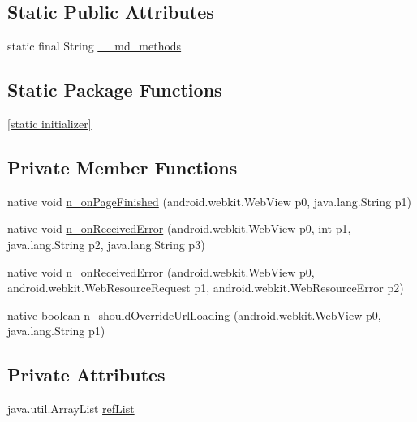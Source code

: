 \subsection*{Static Public Attributes}
\begin{CompactItemize}
\item 
static final String \hyperlink{classmd5b60ffeb829f638581ab2bb9b1a7f4f3f_1_1_web_view_renderer___web_client_b15ec026f7472a54d028a56570e44543}{\_\-\_\-md\_\-methods}
\end{CompactItemize}
\subsection*{Static Package Functions}
\begin{CompactItemize}
\item 
\hyperlink{classmd5b60ffeb829f638581ab2bb9b1a7f4f3f_1_1_web_view_renderer___web_client_7d5b13a9d5d676275c7fc287e984cd2d}{\mbox{[}static initializer\mbox{]}}
\end{CompactItemize}
\subsection*{Private Member Functions}
\begin{CompactItemize}
\item 
native void \hyperlink{classmd5b60ffeb829f638581ab2bb9b1a7f4f3f_1_1_web_view_renderer___web_client_99db1c826929c2ed0f92fe4226fca37d}{n\_\-onPageFinished} (android.webkit.WebView p0, java.lang.String p1)
\item 
native void \hyperlink{classmd5b60ffeb829f638581ab2bb9b1a7f4f3f_1_1_web_view_renderer___web_client_d79d7a4337743489ebd3c346104f6159}{n\_\-onReceivedError} (android.webkit.WebView p0, int p1, java.lang.String p2, java.lang.String p3)
\item 
native void \hyperlink{classmd5b60ffeb829f638581ab2bb9b1a7f4f3f_1_1_web_view_renderer___web_client_1d651253b298787466e21c00db593573}{n\_\-onReceivedError} (android.webkit.WebView p0, android.webkit.WebResourceRequest p1, android.webkit.WebResourceError p2)
\item 
native boolean \hyperlink{classmd5b60ffeb829f638581ab2bb9b1a7f4f3f_1_1_web_view_renderer___web_client_e3e3c0ff01ff214273e665e88e187735}{n\_\-shouldOverrideUrlLoading} (android.webkit.WebView p0, java.lang.String p1)
\end{CompactItemize}
\subsection*{Private Attributes}
\begin{CompactItemize}
\item 
java.util.ArrayList \hyperlink{classmd5b60ffeb829f638581ab2bb9b1a7f4f3f_1_1_web_view_renderer___web_client_71f15194255a9d336085332b3a20da84}{refList}
\end{CompactItemize}


